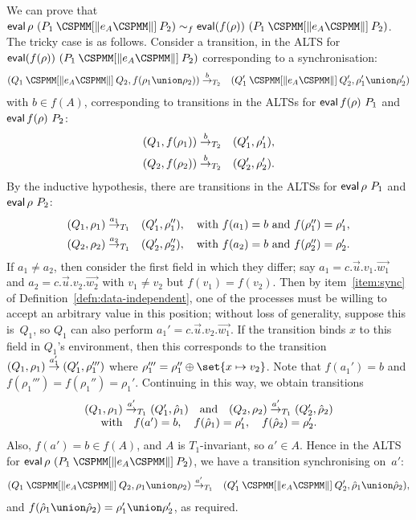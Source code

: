 We can prove that $\eval \rho~ (P_1 \synPar{e_A} P_2) \bisim_f \eval (f(\rho))
~ (P_1 \synPar{e_A} P_2)$.  The tricky case is as follows.
%
Consider a transition, in the ALTS for $\eval (f(\rho)) ~ (P_1 \synPar{e_A}
P_2)$ corresponding to a synchronisation:
%
\begin{eqnarray*}
(Q_1 \synPar{e_A} Q_2, f(\rho_1 \union \rho_2)) & \trans{b}_{T_2} &
  (Q_1' \synPar{e_A} Q_2', \rho_1' \union \rho_2')
\end{eqnarray*}
%
with $b \in f(A)$, corresponding to transitions in the ALTSs for $\mathop{\sf eval}
f(\rho)~ P_1$ and $\mathop{\sf eval} f(\rho)~ P_2$:
%
\begin{eqnarray*}
(Q_1, f(\rho_1)) & \stackrel{b}{\rightarrow}_{T_2} & (Q_1', \rho_1') , \\
(Q_2, f(\rho_2)) & \stackrel{b}{\rightarrow}_{T_2} & (Q_2', \rho_2').
\end{eqnarray*}
%
By the inductive hypothesis, there are transitions in the ALTSs
for $\mathop{\sf eval} \rho~ P_1$ and $\mathop{\sf eval} \rho~ P_2$:
\begin{eqnarray*}
(Q_1, \rho_1) & \stackrel{a_1}{\rightarrow}_{T_1} & (Q_1', \rho_1'') , 
   \quad \mbox{with $f(a_1) = b$ and $f(\rho_1'') = \rho_1'$}, \\
(Q_2, \rho_2) & \stackrel{a_2}{\rightarrow}_{T_1} & (Q_2', \rho_2''),
   \quad \mbox{with $f(a_2) = b$ and $f(\rho_2'') = \rho_2'$}.
\end{eqnarray*}
%
%
If $a_1 \ne a_2$, then consider the first field in which they differ; say $a_1
= c.\vec{u}.v_1.\vec{w_1}$ and $a_2 = c.\vec{u}.v_2.\vec{w_2}$ with $v_1 \ne
v_2$ but $f(v_1) = f(v_2)$.
%
Then by item~\ref{item:sync} of Definition~\ref{defn:data-independent}, one of
the processes must be willing to accept an arbitrary value in this position;
without loss of generality, suppose this is~$Q_1$, so $Q_1$ can also perform
$a_1' = c.\vec{u}.v_2.\vec{w_1}$.  If the transition binds $x$ to this field
in $Q_1$'s environment, then this corresponds to the transition
$(Q_1,\rho_1) \stackrel{a_1'}{\rightarrow} (Q_1',\rho_1''')$ where $\rho_1'''
= \rho_1'' \oplus \set{x \mapsto v_2}$.  Note that $f(a_1') = b$ and
$f(\rho_1''') = f(\rho_1'') = \rho_1'$.
%
Continuing in this way, we obtain transitions
\[
\begin{array}{c}
(Q_1,\rho_1) \stackrel{a'}{\rightarrow}_{T_1} (Q_1',\hat\rho_1) \quad\mbox{and}\quad
(Q_2,\rho_2) \stackrel{a'}{\rightarrow}_{T_1} (Q_2',\hat\rho_2) \\
\mbox{with}\quad f(a')  = b, \quad 
f(\hat\rho_1) = \rho_1', \quad f(\hat\rho_2) = \rho_2'.
\end{array}
\]
Also, $f(a') = b \in f(A)$, and $A$ is $T_1$-invariant, so $a' \in A$.  
Hence in the ALTS for $\eval \rho~ (P_1 \synPar{e_A} P_2)$, we have a
transition synchronising on~$a'$: 
%
\begin{eqnarray*}
(Q_1 \synPar{e_A} Q_2, \rho_1 \union \rho_2) & \trans{a'}_{T_1} &
  (Q_1' \synPar{e_A} Q_2', \hat\rho_1 \union \hat\rho_2),
\end{eqnarray*}
and $f(\hat\rho_1 \union \hat\rho_2) =  \rho_1' \union \rho_2'$, as required.

